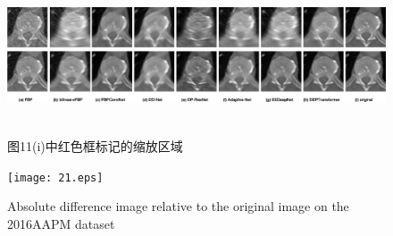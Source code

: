 \begin{figure}
	\centering
	\includegraphics[height=4.67cm,width=18cm]{17.eps}
	\caption{图11(i)中红色框标记的缩放区域}
	\label{fig13}
\end{figure}
\begin{figure}
	\centering
	\texttt{[image: 21.eps]}
	\caption{Absolute difference image relative to the original image on the 2016AAPM dataset}
	\label{fig14}
\end{figure}